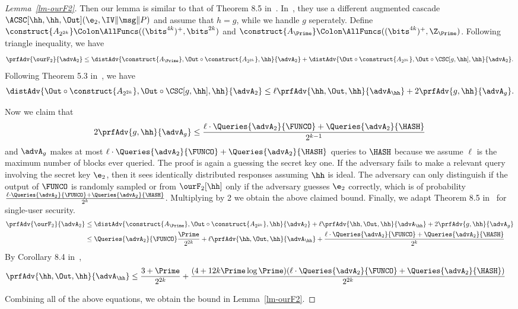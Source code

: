 \begin{proof}[Lemma~\ref{lm-ourF2}]
	Then our lemma is similar to that of Theorem 8.5 in~\cite{EC:BelBerTes16}. In~\cite{EC:BelBerTes16}, they use a different augmented cascade $\ACSC[\hh, \hh, \Out](\e_2, \IV\|\msg\|P)$ and assume that $h=g$, while we handle $g$ seperately. Define $\construct{A_{2^{2k}}}\Colon \AllFuncs((\bits^{4k})^{+},\bits^{2k})$ and $\construct{A_{\Prime}}\Colon \AllFuncs((\bits^{4k})^{+},\Z_{\Prime})$.  Following triangle inequality, we have
	$$\prfAdv{\ourF_2}{\advA_2} \leq \distAdv{\construct{A_{\Prime}}, \Out \circ \construct{A_{2^{2k}}}, \hh}{\advA_2} + \distAdv{\Out \circ \construct{A_{2^{2k}}}, \Out \circ \CSC[g,\hh], \hh}{\advA_2}.$$
	Following Theorem 5.3 in~\cite{EC:BelBerTes16}, we have
	$$\distAdv{\Out \circ \construct{A_{2^{2k}}}, \Out \circ \CSC[g,\hh], \hh}{\advA_2} \leq \ell\prfAdv{\hh, \Out, \hh}{\advA_{\hh}} + 2\prfAdv{g, \hh}{\advA_{g}}.$$
	
	
	Now we claim that 
	$$2\prfAdv{g, \hh}{\advA_{g}} \leq \frac{\ell \cdot \Queries{\advA_2}{\FUNCO} + \Queries{\advA_{2}}{\HASH}}{2^{k-1}}$$
	and $\advA_{g}$ makes at most $\ell \cdot \Queries{\advA_2}{\FUNCO} + \Queries{\advA_{2}}{\HASH}$ queries to $\HASH$ because we assume $\ell$ is the maximum number of blocks ever queried. The proof is again a guessing the secret key one. If the adversary fails to make a relevant query involving the secret key $\e_2$, then it sees identically distributed responses assuming $\hh$ is ideal. The adversary can only distinguish if the output of $\FUNCO$ is randomly sampled or from $\ourF_2[\hh]$ only if the adversary guesses $\e_2$ correctly, which is of probability $\frac{\ell \cdot \Queries{\advA_2}{\FUNCO} + \Queries{\advA_{2}}{\HASH}}{2^{k}}$. Multiplying by 2 we obtain the above claimed bound. Finally, we adapt Theorem 8.5 in~\cite{EC:BelBerTes16} for single-user security. 
	\begin{align}
		\prfAdv{\ourF_2}{\advA_2} & \leq \distAdv{\construct{A_{\Prime}}, \Out \circ \construct{A_{2^{2k}}}, \hh}{\advA_2} + \ell\prfAdv{\hh, \Out, \hh}{\advA_{\hh}} + 2\prfAdv{g, \hh}{\advA_{g}}\\
		&\leq \Queries{\advA_2}{\FUNCO} \frac{\Prime}{2^{2k}} + \ell\prfAdv{\hh, \Out, \hh}{\advA_{\hh}} + \frac{\ell \cdot \Queries{\advA_2}{\FUNCO} + \Queries{\advA_{2}}{\HASH}}{2^{k}}
	\end{align}
	By Corollary 8.4 in~\cite{EC:BelBerTes16},
	\begin{align}
		\prfAdv{\hh, \Out, \hh}{\advA_{\hh}} &\leq \frac{3+\Prime}{2^{2k}} + \frac{(4+12k\Prime\log\Prime)(\ell \cdot \Queries{\advA_2}{\FUNCO} + \Queries{\advA_{2}}{\HASH} )}{2^{2k}}
	\end{align}
	
	Combining all of the above equations, we obtain the bound in Lemma~\ref{lm-ourF2}.
\end{proof}